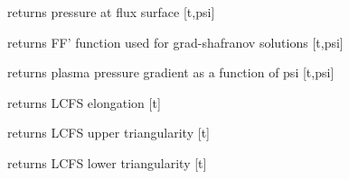 \documentclass[letterpaper,10pt,english]{sphinxmanual}
\begin{document}
\begin{fulllineitems}
\begin{fulllineitems}
\label{eqtools:eqtools.EFIT.EFITTree.getFluxPres}
returns pressure at flux surface {[}t,psi{]}

\end{fulllineitems}


\begin{fulllineitems}
\label{eqtools:eqtools.EFIT.EFITTree.getFFPrime}
returns FF' function used for grad-shafranov solutions {[}t,psi{]}

\end{fulllineitems}


\begin{fulllineitems}
\label{eqtools:eqtools.EFIT.EFITTree.getPPrime}
returns plasma pressure gradient as a function of psi {[}t,psi{]}

\end{fulllineitems}


\begin{fulllineitems}
\label{eqtools:eqtools.EFIT.EFITTree.getElongation}
returns LCFS elongation {[}t{]}

\end{fulllineitems}


\begin{fulllineitems}
\label{eqtools:eqtools.EFIT.EFITTree.getUpperTriangularity}
returns LCFS upper triangularity {[}t{]}

\end{fulllineitems}


\begin{fulllineitems}
\label{eqtools:eqtools.EFIT.EFITTree.getLowerTriangularity}
returns LCFS lower triangularity {[}t{]}


\end{fulllineitems}
\end{fulllineitems}
\end{document}
